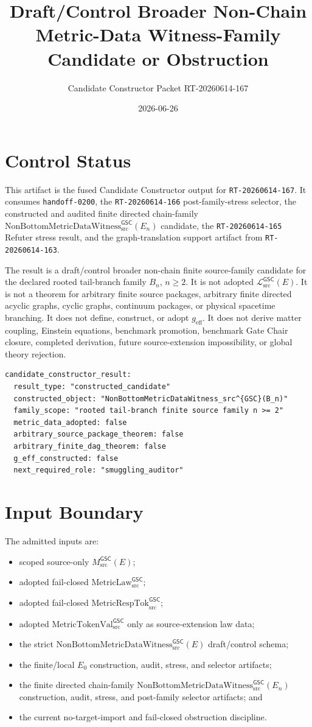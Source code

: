 \documentclass[11pt]{article}
\title{Draft/Control Broader Non-Chain Metric-Data Witness-Family Candidate or Obstruction}
\author{Candidate Constructor Packet RT-20260614-167}
\date{2026-06-26}
\newcommand{\MsrcGSC}{M_{\mathrm{src}}^{\mathsf{GSC}}}
\newcommand{\MetricLaw}{\mathrm{MetricLaw}_{\mathrm{src}}^{\mathsf{GSC}}}
\newcommand{\MetricRespTok}{\mathrm{MetricRespTok}_{\mathrm{src}}^{\mathsf{GSC}}}
\newcommand{\MetricTokenVal}{\mathrm{MetricTokenVal}_{\mathrm{src}}^{\mathsf{GSC}}}
\newcommand{\Witness}{\mathrm{NonBottomMetricDataWitness}_{\mathrm{src}}^{\mathsf{GSC}}}
\newcommand{\MetricData}{\mathcal{L}_{\mathrm{src}}^{\mathsf{GSC}}}
\newcommand{\geff}{g_{\mathrm{eff}}}
\newcommand{\En}{E_n}
\newcommand{\Bn}{B_n}
\begin{document}
\maketitle

\section{Control Status}
\label{control-status}

This artifact is the fused Candidate Constructor output for
\texttt{RT-20260614-167}. It consumes \texttt{handoff-0200}, the
\texttt{RT-20260614-166} post-family-stress selector, the constructed and
audited finite directed chain-family \(\Witness(\En)\) candidate, the
\texttt{RT-20260614-165} Refuter stress result, and the graph-translation
support artifact from \texttt{RT-20260614-163}.

The result is a draft/control broader non-chain finite source-family candidate
for the declared rooted tail-branch family \(\Bn\), \(n\ge 2\). It is not
adopted \(\MetricData(E)\). It is not a theorem for arbitrary finite source
packages, arbitrary finite directed acyclic graphs, cyclic graphs, continuum
packages, or physical spacetime branching. It does not define, construct, or
adopt \(\geff\). It does not derive matter coupling, Einstein equations,
benchmark promotion, benchmark Gate Chair closure, completed derivation,
future source-extension impossibility, or global theory rejection.

\begin{verbatim}
candidate_constructor_result:
  result_type: "constructed_candidate"
  constructed_object: "NonBottomMetricDataWitness_src^{GSC}(B_n)"
  family_scope: "rooted tail-branch finite source family n >= 2"
  metric_data_adopted: false
  arbitrary_source_package_theorem: false
  arbitrary_finite_dag_theorem: false
  g_eff_constructed: false
  next_required_role: "smuggling_auditor"
\end{verbatim}

\section{Input Boundary}
\label{input-boundary}

The admitted inputs are:
\begin{itemize}[leftmargin=*]
  \item scoped source-only \(\MsrcGSC(E)\);
  \item adopted fail-closed \(\MetricLaw\);
  \item adopted fail-closed \(\MetricRespTok\);
  \item adopted \(\MetricTokenVal\) only as source-extension law data;
  \item the strict \(\Witness(E)\) draft/control schema;
  \item the finite/local \(E_0\) construction, audit, stress, and selector
  artifacts;
  \item the finite directed chain-family \(\Witness(\En)\) construction,
  audit, stress, and post-family selector artifacts; and
  \item the current no-target-import and fail-closed obstruction discipline.
\end{itemize}
\end{document}
